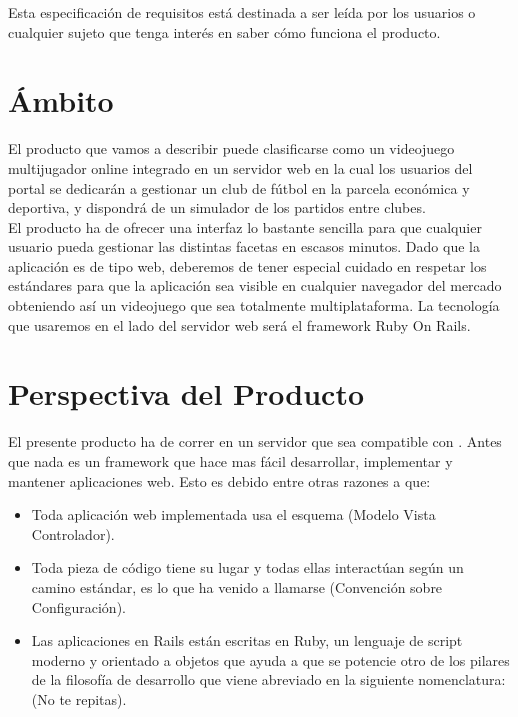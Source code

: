Esta especificación de requisitos está destinada a ser leída por los
usuarios o cualquier sujeto que tenga interés en saber cómo funciona
el producto.

\section{Ámbito}
El producto que vamos a describir puede clasificarse como un
videojuego multijugador online integrado en un servidor web en la cual
los usuarios del portal se dedicarán a gestionar un club de fútbol en
la parcela económica y deportiva, y dispondrá de un simulador de los
partidos entre clubes.\\

El producto ha de ofrecer una interfaz lo bastante sencilla para que
cualquier usuario pueda gestionar las distintas facetas en escasos
minutos. Dado que la aplicación es de tipo web, deberemos de tener
especial cuidado en respetar los estándares para que la aplicación sea
visible en cualquier navegador del mercado obteniendo así un
videojuego que sea totalmente multiplataforma. La tecnología que
usaremos en el lado del servidor web será el framework Ruby On Rails.

\section{Perspectiva del Producto}
El presente producto ha de correr en un servidor que sea compatible
con . Antes que nada  es un framework que
hace mas fácil desarrollar, implementar y mantener aplicaciones
web. Esto es debido entre otras razones a que:

\begin{itemize}
\item Toda aplicación web implementada usa el esquema 
  (Modelo Vista Controlador).
  
\item Toda pieza de código tiene su lugar y todas ellas interactúan
  según un camino estándar, es lo que ha venido a llamarse
   (Convención sobre Configuración).
  
\item Las aplicaciones en Rails están escritas en Ruby, un lenguaje de
script moderno y orientado a objetos que ayuda a que se potencie otro
de los pilares de la filosofía de desarrollo que viene abreviado en la
siguiente nomenclatura:  (No te repitas).
\end{itemize}

